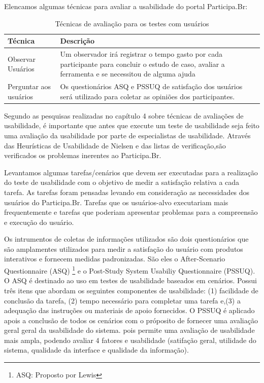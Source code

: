 Elencamos algumas técnicas para avaliar a usabilidade do portal Participa.Br:

\begin{table}[h]
\begin{tabular}{|l| p{10cm} |}
\hline
Técnica & Descrição \\ \hline
Observar Usuários & Um observador irá registrar o tempo 
gasto por cada participante para concluir o estudo de caso, 
avaliar a ferramenta e se necessitou de alguma ajuda    \\ \hline
Perguntar aos usuários & Os questionários ASQ e PSSUQ 
de satisfação dos usuários será utilizado 
para coletar as opiniões dos participantes.\\ \hline
\end{tabular}
\caption{Técnicas de avaliação para os testes com usuários}
\end{table}


Segundo as pesquisas realizadas no capítulo 4 sobre técnicas de avaliações de usabilidade, é importante que antes que execute um teste de usabilidade seja feito uma avaliação da usabilidade por parte de especialistas de usabilidade.
%
Através das Heurísticas de Usabilidade de Nielsen e das listas de verificação,são verificados os problemas inerentes ao Participa.Br.

Levantamos algumas tarefas/cenários que devem ser executadas para a realização do teste de usabilidade com o objetivo de medir a satisfação relativa a cada tarefa. As tarefas foram pensadas levando em consideração as necessidades dos usuários do Participa.Br. Tarefas que os usuários-alvo executariam mais frequentemente e tarefas que poderiam apresentar problemas para a compreensão e execução do usuário. 

Os intrumentos de coletas de informações utilizados são dois questionários que são amplamentes utilizados para medir a satisfação do usuário com produtos interativos e fornecem medidas padronizadas.
%
São eles o After-Scenario Questionnaire (ASQ) \footnote{ASQ: Proposto por Lewis} e o Post-Study System Usabiliy Questionnaire (PSSUQ). 
%
O ASQ é destinado ao uso em testes de usabilidade baseados em cenários. Possui três itens que abordam os seguintes componentes de usabilidade: (1) facilidade de conclusão da tarefa, (2) tempo necessário para completar uma tarefa e,(3) a adequação das instruções ou materiais de apoio fornecidos.
%
O PSSUQ é aplicado apois a conclusão de todos os cenários com o próposito de fornecer uma avaliação geral geral da usabilidade do sistema. pois permite uma avaliação de usabilidade mais ampla, podendo avaliar 4 fatores e usabilidade (satifação geral, utilidade do sistema, qualidade da interface e qualidade da informação). 

